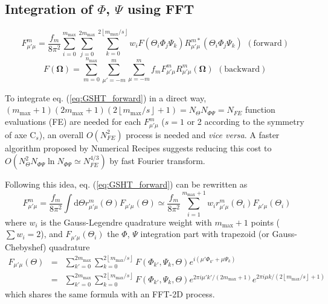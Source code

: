 \subsection{Integration of $\Phi$, $\Psi$ using FFT}

\[
F_{\mu'\mu}^{m}=\frac{f_{m}}{8\pi^{2}}\sum_{i=0}^{m_{\mathrm{max}}}\sum_{j=0}^{2m_{\mathrm{max}}}\sum_{k=0}^{2\left\lfloor m_{\mathrm{max}}/s\right\rfloor }w_{i}F(\Theta_{i}\Phi_{j}\Psi_{k})R_{\mu'\mu}^{m*}(\Theta_{i}\Phi_{j}\Psi_{k})\begin{array}{c}
\mathrm{(forward)}\end{array}
\]
\[
F(\mathbf{\Omega})=\sum_{m=0}^{n_{\mathrm{max}}}\sum_{\mu'=-m}^{m}\sum_{\mu=-m}^{m}f_{m}F_{\mu'\mu}^{m}R_{\mu'\mu}^{m}(\mathbf{\Omega})\begin{array}{c}
\mathrm{(backward)}\end{array}
\]


To integrate eq. (\ref{eq:GSHT_forward}) in a direct way, $(m_{\mathrm{max}}+1)(2m_{\mathrm{max}}+1)(2\left\lfloor m_{\mathrm{max}}/s\right\rfloor +1)=N_{\Theta}N_{\Phi\Psi}=N_{FE}$
function evaluations (FE) are needed for each $F_{\mu'\mu}^{m}$ ($s=1$
or 2 according to the symmetry of axe $\mathrm{C}_{s}$), an overall
$O(N_{FE}^{2})$ process is needed and \textit{vice versa}. A faster
algorithm proposed by Numerical Recipes \citep{Numerical_Recipes_3ed}
suggests reducing this cost to $O(N_{\Theta}^{2}N_{\Phi\Psi}\ln N_{\Phi\Psi}\simeq N_{FE}^{4/3})$
by fast Fourier transform.

Following this idea, eq. (\ref{eq:GSHT_forward}) can be rewritten
as
\begin{equation}
F_{\mu'\mu}^{m}=\frac{f_{m}}{8\pi^{2}}\int\mathrm{d}\Theta r_{\mu'\mu}^{m}(\Theta)F_{\mu'\mu}(\Theta)\simeq\frac{f_{m}}{8\pi^{2}}\sum_{i=1}^{m_{\mathrm{max}}+1}w_{i}r_{\mu'\mu}^{m}(\Theta_{i})F_{\mu'\mu}(\Theta_{i})
\end{equation}
where $w_{i}$ is the Gauss-Legendre quadrature weight with $m_{\mathrm{max}}+1$
points ($\sum w_{i}=2$), and $F_{\mu'\mu}(\Theta_{i})$ the $\Phi$,
$\Psi$ integration part with trapezoid (or Gauss-Chebyshef) quadrature
\begin{eqnarray}
F_{\mu'\mu}(\Theta) & = & \sum_{k'=0}^{2m_{\mathrm{max}}}\sum_{k=0}^{2\left\lfloor m_{\mathrm{max}}/s\right\rfloor }F(\Phi_{k'},\Psi_{k},\Theta)e^{i(\mu'\Phi_{k'}+\mu\Psi_{k})}\label{eq:f_mup_mu}\\
 & = & \sum_{k'=0}^{2m_{\mathrm{max}}}\sum_{k=0}^{2\left\lfloor m_{\mathrm{max}}/s\right\rfloor }F(\Phi_{k'},\Psi_{k},\Theta)e^{2\pi i\mu'k'/(2m_{\mathrm{max}}+1)}e^{2\pi i\mu k/(2\left\lfloor m_{\mathrm{max}}/s\right\rfloor +1)}\nonumber 
\end{eqnarray}
which shares the same formula with an FFT-2D process.

